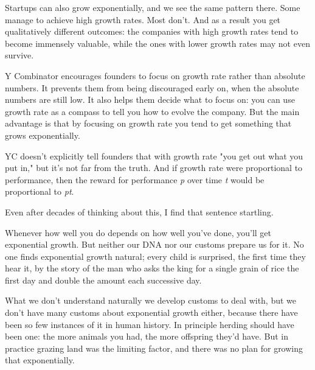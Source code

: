 Startups can also
                  grow exponentially, and we see the same pattern there. Some
                  manage to achieve high growth rates. Most don't. And as a
                  result you get qualitatively different outcomes: the companies
                  with high growth rates tend to become immensely valuable,
                  while the ones with lower growth rates may not even
                  survive.

Y Combinator encourages founders to focus
                  on growth rate rather than absolute numbers. It prevents them
                  from being discouraged early on, when the absolute numbers are
                  still low. It also helps them decide what to focus on: you can
                  use growth rate as a compass to tell you how to evolve the
                  company. But the main advantage is that by focusing on growth
                  rate you tend to get something that grows exponentially.

YC
                  doesn't explicitly tell founders that with growth rate "you
                  get out what you put in," but it's not far from the truth. And
                  if growth rate were proportional to performance, then the
                  reward for performance \emph{p} over time \emph{t} would be
                  proportional to \emph{pt}.

Even after decades of thinking about this, I
                  find that sentence startling.

Whenever how well you
                  do depends on how well you've done, you'll get exponential
                  growth. But neither our DNA nor our customs prepare us for it.
                  No one finds exponential growth natural; every child is
                  surprised, the first time they hear it, by the story of the
                  man who asks the king for a single grain of rice the first day
                  and double the amount each successive day.

What we
                  don't understand naturally we develop customs to deal with,
                  but we don't have many customs about exponential growth
                  either, because there have been so few instances of it in
                  human history. In principle herding should have been one: the
                  more animals you had, the more offspring they'd have. But in
                  practice grazing land was the limiting factor, and there was
                  no plan for growing that exponentially.

